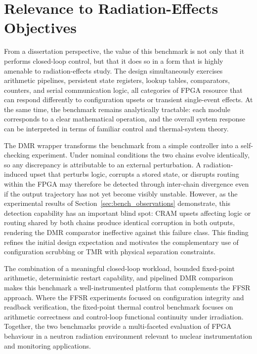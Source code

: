 \section{Relevance to Radiation-Effects Objectives}
\label{sec:bench_relevance}

From a dissertation perspective, the value of this benchmark is not
only that it performs closed-loop control, but that it does so in a form
that is highly amenable to radiation-effects study.  The design
simultaneously exercises arithmetic pipelines, persistent state
registers, lookup tables, comparators, counters, and serial
communication logic, all categories of FPGA resource that can respond
differently to configuration upsets or transient single-event effects.
At the same time, the benchmark remains analytically tractable: each
module corresponds to a clear mathematical operation, and the overall
system response can be interpreted in terms of familiar control and
thermal-system theory.

The DMR wrapper transforms the benchmark from a simple controller into a
self-checking experiment.  Under nominal conditions the two chains evolve
identically, so any discrepancy is attributable to an external
perturbation.  A radiation-induced upset that perturbs logic, corrupts a
stored state, or disrupts routing within the FPGA may therefore be
detected through inter-chain divergence even if the output trajectory has
not yet become visibly unstable.  However, as the experimental results of
Section~\ref{sec:bench_observations} demonstrate, this detection
capability has an important blind spot: CRAM upsets affecting logic or
routing shared by both chains produce identical corruption in both
outputs, rendering the DMR comparator ineffective against this failure
class.  This finding refines the initial design expectation and
motivates the complementary use of configuration scrubbing or TMR with
physical separation constraints.

The combination of a meaningful closed-loop workload, bounded
fixed-point arithmetic, deterministic restart capability, and pipelined
DMR comparison makes this benchmark a well-instrumented platform that
complements the FFSR approach.  Where the FFSR experiments focused on
configuration integrity and readback verification, the fixed-point
thermal control benchmark focuses on arithmetic correctness and
control-loop functional continuity under irradiation.  Together, the two
benchmarks provide a multi-faceted evaluation of FPGA behaviour in a
neutron radiation environment relevant to nuclear instrumentation and
monitoring applications.

